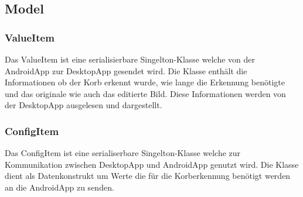 \subsection{Model}

\subsubsection{ValueItem}
Das ValueItem ist eine serialisierbare Singelton-Klasse welche von der AndroidApp zur DesktopApp gesendet wird. Die Klasse enthält die Informationen ob der Korb erkennt wurde, wie lange die Erkennung benötigte und das originale wie auch das editierte Bild. Diese Informationen werden von der DesktopApp ausgelesen und dargestellt. 

\subsubsection{ConfigItem}
Das ConfigItem ist eine serialiserbare Singelton-Klasse welche zur Kommunikation zwischen DesktopApp und AndroidApp genutzt wird. Die Klasse dient als Datenkonstrukt um Werte die für die Korberkennung benötigt werden an die AndroidApp zu senden.

            
            
